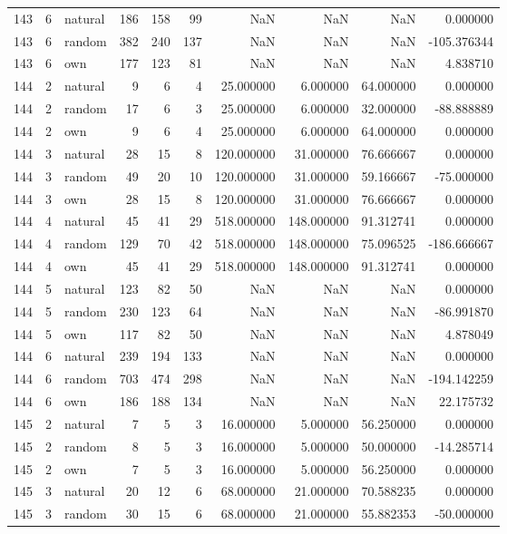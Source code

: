 \begin{table}[htbp]
\begin{tabular}{rrlrrrrrrr}
143 & 6 & natural & 186 & 158 & 99 & NaN & NaN & NaN & 0.000000 \\
143 & 6 & random & 382 & 240 & 137 & NaN & NaN & NaN & -105.376344 \\
143 & 6 & own & 177 & 123 & 81 & NaN & NaN & NaN & 4.838710 \\
144 & 2 & natural & 9 & 6 & 4 & 25.000000 & 6.000000 & 64.000000 & 0.000000 \\
144 & 2 & random & 17 & 6 & 3 & 25.000000 & 6.000000 & 32.000000 & -88.888889 \\
144 & 2 & own & 9 & 6 & 4 & 25.000000 & 6.000000 & 64.000000 & 0.000000 \\
144 & 3 & natural & 28 & 15 & 8 & 120.000000 & 31.000000 & 76.666667 & 0.000000 \\
144 & 3 & random & 49 & 20 & 10 & 120.000000 & 31.000000 & 59.166667 & -75.000000 \\
144 & 3 & own & 28 & 15 & 8 & 120.000000 & 31.000000 & 76.666667 & 0.000000 \\
144 & 4 & natural & 45 & 41 & 29 & 518.000000 & 148.000000 & 91.312741 & 0.000000 \\
144 & 4 & random & 129 & 70 & 42 & 518.000000 & 148.000000 & 75.096525 & -186.666667 \\
144 & 4 & own & 45 & 41 & 29 & 518.000000 & 148.000000 & 91.312741 & 0.000000 \\
144 & 5 & natural & 123 & 82 & 50 & NaN & NaN & NaN & 0.000000 \\
144 & 5 & random & 230 & 123 & 64 & NaN & NaN & NaN & -86.991870 \\
144 & 5 & own & 117 & 82 & 50 & NaN & NaN & NaN & 4.878049 \\
144 & 6 & natural & 239 & 194 & 133 & NaN & NaN & NaN & 0.000000 \\
144 & 6 & random & 703 & 474 & 298 & NaN & NaN & NaN & -194.142259 \\
144 & 6 & own & 186 & 188 & 134 & NaN & NaN & NaN & 22.175732 \\
145 & 2 & natural & 7 & 5 & 3 & 16.000000 & 5.000000 & 56.250000 & 0.000000 \\
145 & 2 & random & 8 & 5 & 3 & 16.000000 & 5.000000 & 50.000000 & -14.285714 \\
145 & 2 & own & 7 & 5 & 3 & 16.000000 & 5.000000 & 56.250000 & 0.000000 \\
145 & 3 & natural & 20 & 12 & 6 & 68.000000 & 21.000000 & 70.588235 & 0.000000 \\
145 & 3 & random & 30 & 15 & 6 & 68.000000 & 21.000000 & 55.882353 & -50.000000 \\

\end{tabular}
\end{table}
